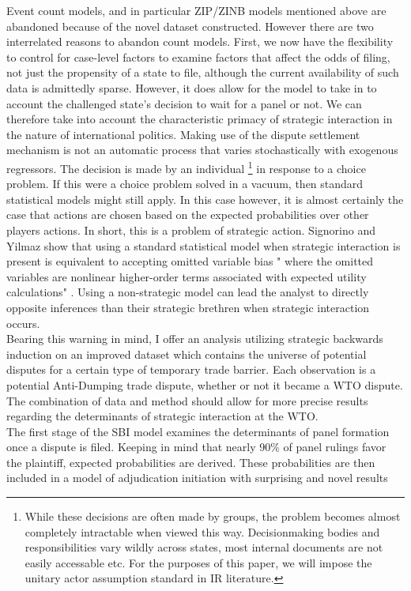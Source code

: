 \documentclass[]{article}
\begin{document}
Event count models, and in particular ZIP/ZINB models mentioned above are abandoned because of the novel dataset constructed. However there are two interrelated reasons to abandon count models. First, we now have the flexibility to control for case-level factors to examine factors that affect the odds of filing, not just the propensity of a state to file, although the current availability of such data is admittedly sparse. However, it does allow for the model to take in to account the challenged state's decision to wait for a panel or not. We can therefore take into account the characteristic primacy of strategic interaction in the nature of international politics. Making use of the dispute settlement mechanism is not an automatic process that varies stochastically with exogenous regressors. The decision is made by an individual \footnote{While these decisions are often made by groups, the problem becomes almost completely intractable when viewed this way. Decisionmaking bodies and responsibilities vary wildly across states, most internal documents are not easily accessable etc. For the purposes of this paper, we will impose the unitary actor assumption standard in IR literature.}  in response to a choice problem. If this were a choice problem solved in a vacuum, then standard statistical models might still apply. In this case however, it is almost certainly the case that actions are chosen based on the expected probabilities over other players actions. In short, this is a problem of strategic action. Signorino and Yilmaz show that using a standard statistical model when strategic interaction is present is equivalent to accepting omitted variable bias " where the omitted variables are nonlinear higher-order terms associated with expected utility calculations" \cite{SY2003}. Using a non-strategic model can lead the analyst to directly opposite inferences than their strategic brethren when strategic interaction occurs. \\

Bearing this warning in mind, I offer an analysis utilizing strategic backwards induction on an improved dataset which contains the universe of potential disputes for a certain type of temporary trade barrier. Each observation is a potential Anti-Dumping trade dispute, whether or not it became a WTO dispute. The combination of data and method should allow for more precise results regarding the determinants of strategic interaction at the WTO. \\

 The first stage of the SBI model examines the determinants of panel formation once a dispute is filed. Keeping in mind that nearly 90\% of panel rulings favor the plaintiff, expected probabilities are derived. These probabilities are then included in a model of adjudication initiation with surprising and novel results 
\end{document}
